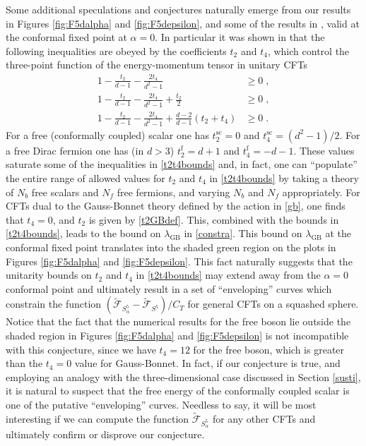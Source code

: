 \documentclass[12pt]{article}
\numberwithin{equation}{section}
\newcommand{\ssc}{\scriptscriptstyle}
\newcommand{\ctt}{C_{\ssc T}}
\begin{document}
Some additional speculations and conjectures naturally emerge from our results in Figures \ref{fig:F5dalpha} and \ref{fig:F5depsilon}, and some of the results in \cite{Buchel:2009sk}, valid at the conformal fixed point at $\alpha=0$. In particular it was shown in \cite{Buchel:2009sk} that the following inequalities are obeyed by the coefficients $t_2$ and $t_4$, which control the three-point function of the energy-momentum tensor in unitary CFTs
%
\begin{equation}\label{t2t4bounds}
\begin{split}
1-\frac{t_2}{d-1}-\frac{2t_4}{d^2-1} &\geq 0\;, \\
1-\frac{t_2}{d-1}-\frac{2t_4}{d^2-1}+\frac{t_2}{2} &\geq 0\;, \\
1-\frac{t_2}{d-1}-\frac{2t_4}{d^2-1} +\frac{d-2}{d-1}(t_2+t_4)&\geq 0\;.
\end{split}
\end{equation}
%
For a free (conformally coupled) scalar one has $t_2^{\text{sc}} = 0$ and $t_4^{\text{sc}} = (d^2-1)/2$. For a free Dirac fermion one has (in $d>3$) $t_2^{\text{f}} = d+1$ and $t_4^{\text{f}} = -d-1$. These values saturate some of the inequalities in \eqref{t2t4bounds} and, in fact, one can ``populate'' the entire range of allowed values for $t_2$ and $t_4$ in \eqref{t2t4bounds} by taking a theory of $N_b$ free scalars and $N_f$ free fermions, and varying $N_b$ and $N_f$ appropriately. For CFTs dual to the Gauss-Bonnet theory defined by the action in \eqref{gb}, one finds that $t_4=0$, and $t_2$ is given by \eqref{t2GBdef}. This, combined with the bounds in \eqref{t2t4bounds}, leads to the bound on $\lambda_{\text{GB}}$ in \eqref{constra}. This bound on $\lambda_{\text{GB}}$ at the conformal fixed point translates into the shaded green region on the plots in Figures \ref{fig:F5dalpha} and \ref{fig:F5depsilon}. This fact naturally suggests that the unitarity bounds on $t_2$ and $t_4$ in \eqref{t2t4bounds} may extend away from the $\alpha=0$ conformal point and ultimately result in a set of ``enveloping'' curves which constrain the function $(\tilde{\mathcal{F}}_{S^5_{\alpha}}-\tilde{\mathcal{F}}_{S^5})/\ctt$ for general CFTs on a squashed sphere. Notice that the fact that the numerical results for the free boson lie outside the shaded region in Figures \ref{fig:F5dalpha} and \ref{fig:F5depsilon} is not incompatible with this conjecture, since we have $t_4=12$ for the free boson, which is greater than the $t_4=0$ value for Gauss-Bonnet. In fact, if our conjecture is true, and employing an analogy with the three-dimensional case discussed in Section \ref{susti}, it is natural to suspect that the free energy of the conformally coupled scalar is one of the putative ``enveloping'' curves. Needless to say, it will be most interesting if we can compute the function $\tilde{\mathcal{F}}_{S^5_{\alpha}}$ for any other CFTs and ultimately confirm or disprove our conjecture.
\end{document}

